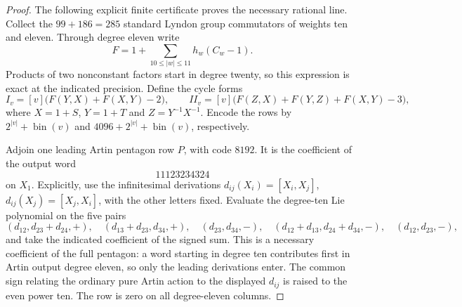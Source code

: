 \begin{proof}
The following explicit finite certificate proves the necessary
rational line. Collect the $99+186=285$ standard Lyndon group
commutators of weights ten and eleven. Through degree eleven
write
\[
 F=1+\sum_{10\le|w|\le11}h_w(C_w-1).
\]
Products of two nonconstant factors start in degree twenty, so
this expression is exact at the indicated precision. Define the
cycle forms
\[
 I_v=[v]\bigl(F(Y,X)+F(X,Y)-2\bigr),\qquad
 II_v=[v]\bigl(F(Z,X)+F(Y,Z)+F(X,Y)-3\bigr),
\]
where $X=1+S$, $Y=1+T$ and $Z=Y^{-1}X^{-1}$. Encode the rows by
$2^{|v|}+\operatorname{bin}(v)$ and
$4096+2^{|v|}+\operatorname{bin}(v)$, respectively.

Adjoin one leading Artin pentagon row $P$, with code $8192$.
It is the coefficient of the output word
\[
 11123234324
\]
on $X_1$. Explicitly, use the infinitesimal derivations
$d_{ij}(X_i)=[X_i,X_j]$, $d_{ij}(X_j)=[X_j,X_i]$, with the other
letters fixed. Evaluate the degree-ten Lie polynomial on the
five pairs
\[
 (d_{12},d_{23}+d_{24},+),\quad
 (d_{13}+d_{23},d_{34},+),\quad
 (d_{23},d_{34},-),\quad
 (d_{12}+d_{13},d_{24}+d_{34},-),\quad
 (d_{12},d_{23},-),
\]
and take the indicated coefficient of the signed sum. This is a
necessary coefficient of the full pentagon: a word starting in
degree ten contributes first in Artin output degree eleven, so
only the leading derivations enter. The common sign relating the
ordinary pure Artin action to the displayed $d_{ij}$ is raised to
the even power ten. The row is zero on all degree-eleven columns.


\end{proof}
